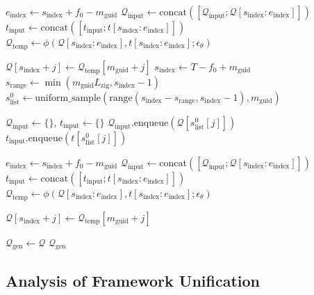 \documentclass{article}
\theoremstyle{plain}
\theoremstyle{definition}
\theoremstyle{remark}
\begin{document}
\begin{algorithm}[htbp]
\begin{algorithmic}[1]
            \STATE $e_\mathrm{index} \gets s_\mathrm{index} + f_0 - m_\mathrm{guid}$
            \STATE $\mathcal{Q}_\mathrm{input} \gets \mathrm{concat}([\mathcal{Q}_\mathrm{input}; \mathcal{Q}[s_\mathrm{index}:e_\mathrm{index}]])$
            \STATE $t_\mathrm{input} \gets \mathrm{concat}([t_\mathrm{input}; t[s_\mathrm{index}:e_\mathrm{index}]])$
            \STATE $\mathcal{Q}_\mathrm{temp} \gets \phi(\mathcal{Q}[s_\mathrm{index}:e_\mathrm{index}], t[s_\mathrm{index}:e_\mathrm{index}]; \epsilon_\theta)$

                \STATE $\mathcal{Q}[s_\mathrm{index}+j] \gets \mathcal{Q}_\mathrm{temp}[m_\mathrm{guid} + j]$
            \ENDFOR
        \ENDIF
    \ELSE
        \STATE $s_\mathrm{index} \gets T - f_0 + m_\mathrm{guid}$
        \STATE $s_\mathrm{range} \gets \min(m_\mathrm{guid} L_{\mathrm{zig}}, s_\mathrm{index}-1)$
        \STATE $s^0_\mathrm{list} \gets \mathrm{uniform\_sample}(\mathrm{range}(s_\mathrm{index}-s_\mathrm{range}, s_\mathrm{index}-1), m_\mathrm{guid})$

        \STATE $\mathcal{Q}_\mathrm{input} \gets \{\}$, \quad $t_\mathrm{input} \gets \{\}$
            \STATE $\mathcal{Q}_\mathrm{input}.\text{enqueue}(\mathcal{Q}[s^0_\mathrm{list}[j]])$
            \STATE $t_\mathrm{input}.\text{enqueue}(t[s^0_\mathrm{list}[j]])$
        \ENDFOR

        \STATE $e_\mathrm{index} \gets s_\mathrm{index} + f_0 - m_\mathrm{guid}$
        \STATE $\mathcal{Q}_\mathrm{input} \gets \mathrm{concat}([\mathcal{Q}_\mathrm{input}; \mathcal{Q}[s_\mathrm{index}:e_\mathrm{index}]])$
        \STATE $t_\mathrm{input} \gets \mathrm{concat}([t_\mathrm{input}; t[s_\mathrm{index}:e_\mathrm{index}]])$
        \STATE $\mathcal{Q}_\mathrm{temp} \gets \phi(\mathcal{Q}[s_\mathrm{index}:e_\mathrm{index}], t[s_\mathrm{index}:e_\mathrm{index}]; \epsilon_\theta)$

            \STATE $\mathcal{Q}[s_\mathrm{index}+j] \gets \mathcal{Q}_\mathrm{temp}[m_\mathrm{guid} + j]$
        \ENDFOR
    \ENDIF
\ENDFOR

\STATE $\mathcal{Q}_\mathrm{gen} \gets \mathcal{Q}$
 $\mathcal{Q}_\mathrm{gen}$

\end{algorithmic}
\end{algorithm}


\subsection{Analysis of Framework Unification}
\label{app:unification_analyse}
\end{document}

